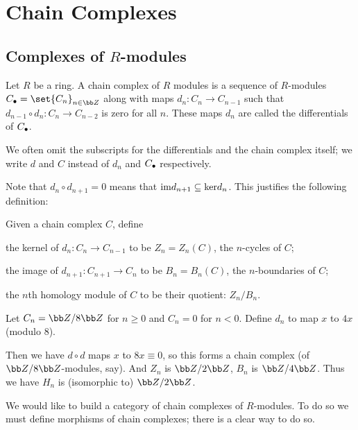 \section{Chain Complexes}

\subsection{Complexes of $R$-modules}

\bdefn

    Let $R$ be a ring.
    A {\emphcolor chain complex} of $R$ modules is a sequence of $R$-modules $C_\bul=\set{C_n}_{n\in\bZ}$ along with maps $d_n\colon C_n\to C_{n-1}$
    such that $d_{n-1}\circ d_n\colon C_n\to C_{n-2}$ is zero for all $n$.
    These maps $d_n$ are called the {\emphcolor differentials} of $C_\bullet$.

\edefn

We often omit the subscripts for the differentials and the chain complex itself; we write $d$ and $C$ instead of $d_n$ and $C_\bullet$ respectively.

Note that $d_n\circ d_{n+1}=0$ means that ${\rm im} d_{n+1}\subseteq{\rm ker} d_n$.
This justifies the following definition:

\bdefn

    Given a chain complex $C$, define
    \benum
        \item the kernel of $d_n\colon C_n\to C_{n-1}$ to be $Z_n=Z_n(C)$, the {\emphcolor $n$-cycles} of $C$;
        \item the image of $d_{n+1}\colon C_{n+1}\to C_n$ to be $B_n=B_n(C)$, the {\emphcolor $n$-boundaries} of $C$;
        \item the {\emphcolor $n$th homology module} of $C$ to be their quotient: $Z_n/B_n$.
    \eenum

\edefn

\bexam

    Let $C_n=\bZ/8\bZ$ for $n\geq0$ and $C_n=0$ for $n<0$.
    Define $d_n$ to map $x$ to $4x$ (modulo $8$).

    Then we have $d\circ d$ maps $x$ to $8x\equiv0$, so this forms a chain complex (of $\bZ/8\bZ$-modules, say).
    And $Z_n$ is $\bZ/2\bZ$, $B_n$ is $\bZ/4\bZ$.
    Thus we have $H_n$ is (isomorphic to) $\bZ/2\bZ$.

\eexam

We would like to build a category of chain complexes of $R$-modules.
To do so we must define morphisms of chain complexes; there is a clear way to do so.


